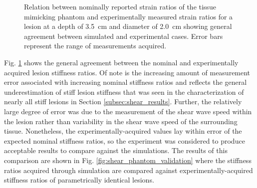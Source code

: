 			\begin{figure}[!htb]
				\centering
				\caption[Experimental shear wave speed quantification results]{Relation between nominally reported strain ratios of the tissue mimicking phantom and experimentally measured strain ratios for a lesion at a depth of \SI{3.5}{\cm} and diameter of \SI{2.0}{\cm} showing general agreement between simulated and experimental cases. Error bars represent the range of measurements acquired.}
				\label{fig:shear_phantom_validation_nominal}
			\end{figure}

			Fig. \ref{fig:shear_phantom_validation_nominal} shows the general agreement between the nominal and experimentally acquired lesion stiffness ratios. Of note is the increasing amount of measurement error associated with increasing nominal stiffness ratios and reflects the general underestimation of stiff lesion stiffness that was seen in the characterization of nearly all stiff lesions in Section \ref{subsec:shear_results}. Further, the relatively large degree of error was due to the measurement of the shear wave speed within the lesion rather than variability in the shear wave speed of the surrounding tissue. Nonetheless, the experimentally-acquired values lay within error of the expected nominal stiffness ratios, so the experiment was considered to produce acceptable results to compare against the simulations. The results of this comparison are shown in Fig. \ref{fig:shear_phantom_validation} where the stiffness ratios acquired through simulation are compared against experimentally-acquired stiffness ratios of parametrically identical lesions.

